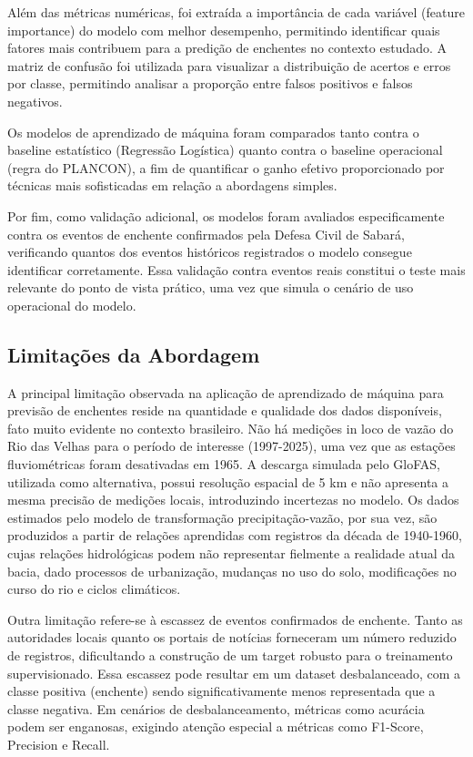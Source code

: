 \documentclass[12pt]{article}
\begin{document}
Além das métricas numéricas, foi extraída a importância de cada variável (feature importance) do modelo com melhor desempenho, permitindo identificar quais fatores mais contribuem para a predição de enchentes no contexto estudado. A matriz de confusão foi utilizada para visualizar a distribuição de acertos e erros por classe, permitindo analisar a proporção entre falsos positivos e falsos negativos.

Os modelos de aprendizado de máquina foram comparados tanto contra o baseline estatístico (Regressão Logística) quanto contra o baseline operacional (regra do PLANCON), a fim de quantificar o ganho efetivo proporcionado por técnicas mais sofisticadas em relação a abordagens simples.

Por fim, como validação adicional, os modelos foram avaliados especificamente contra os eventos de enchente confirmados pela Defesa Civil de Sabará, verificando quantos dos eventos históricos registrados o modelo consegue identificar corretamente. Essa validação contra eventos reais constitui o teste mais relevante do ponto de vista prático, uma vez que simula o cenário de uso operacional do modelo.

\subsection{Limitações da Abordagem}

A principal limitação observada na aplicação de aprendizado de máquina para previsão de enchentes reside na quantidade e qualidade dos dados disponíveis, fato muito evidente no contexto brasileiro. Não há medições in loco de vazão do Rio das Velhas para o período de interesse (1997-2025), uma vez que as estações fluviométricas foram desativadas em 1965. A descarga simulada pelo GloFAS, utilizada como alternativa, possui resolução espacial de 5 km e não apresenta a mesma precisão de medições locais, introduzindo incertezas no modelo. Os dados estimados pelo modelo de transformação precipitação-vazão, por sua vez, são produzidos a partir de relações aprendidas com registros da década de 1940-1960, cujas relações hidrológicas podem não representar fielmente a realidade atual da bacia, dado processos de urbanização, mudanças no uso do solo, modificações no curso do rio e ciclos climáticos.

Outra limitação refere-se à escassez de eventos confirmados de enchente. Tanto as autoridades locais quanto os portais de notícias forneceram um número reduzido de registros, dificultando a construção de um target robusto para o treinamento supervisionado. Essa escassez pode resultar em um dataset desbalanceado, com a classe positiva (enchente) sendo significativamente menos representada que a classe negativa. Em cenários de desbalanceamento, métricas como acurácia podem ser enganosas, exigindo atenção especial a métricas como F1-Score, Precision e Recall.
\end{document}
